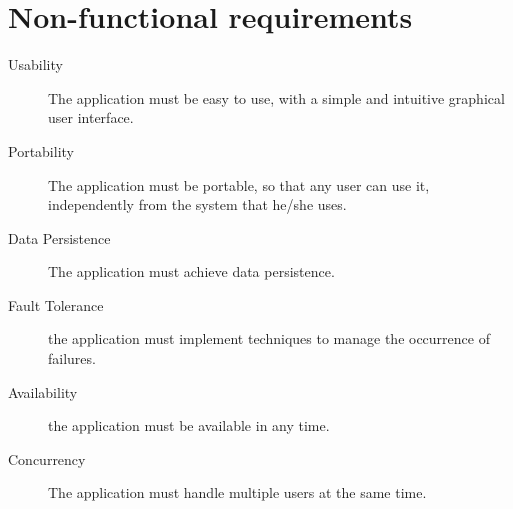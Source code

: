\section{Non-functional requirements}\label{sec:nonfunctionalrequirements}

\begin{description}
	\item[Usability] The application must be easy to use, with a simple and
		intuitive graphical user interface.
	\item[Portability] The application must be portable, so that any user
		can use it, independently from the system that he/she uses.
	\item[Data Persistence] The application must achieve data persistence.
	\item[Fault Tolerance] the application must implement techniques to
		manage the occurrence of failures.
	\item[Availability] the application must be available in any time.
	\item[Concurrency] The application must handle multiple users at the
		same time.
\end{description}
